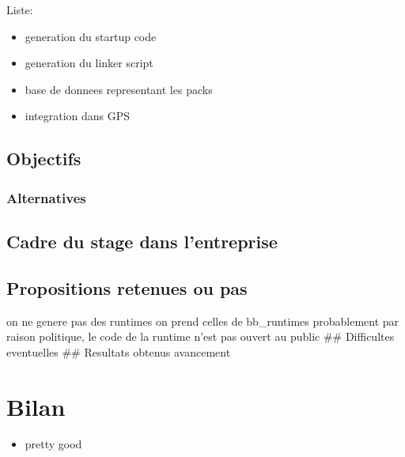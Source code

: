 \documentclass[11pt,]{article}
\providecommand{\tightlist}{%
  \setlength{\itemsep}{0pt}\setlength{\parskip}{0pt}}
\begin{document}
Liste:

\begin{itemize}
\tightlist
\item
  generation du startup code
\item
  generation du linker script
\item
  base de donnees representant les packs
\item
  integration dans GPS
\end{itemize}

\subsection{Objectifs}\label{objectifs}

\subsubsection{Alternatives}\label{alternatives}

\subsection{Cadre du stage dans
l'entreprise}\label{cadre-du-stage-dans-lentreprise}

\subsection{Propositions retenues ou
pas}\label{propositions-retenues-ou-pas}

on ne genere pas des runtimes on prend celles de bb\_runtimes
probablement par raison politique, le code de la runtime n'est pas
ouvert au public \#\# Difficultes eventuelles \#\# Resultats obtenus
avancement

\section{Bilan}\label{bilan}

\begin{itemize}
\tightlist
\item
  pretty good
\end{itemize}
\end{document}
